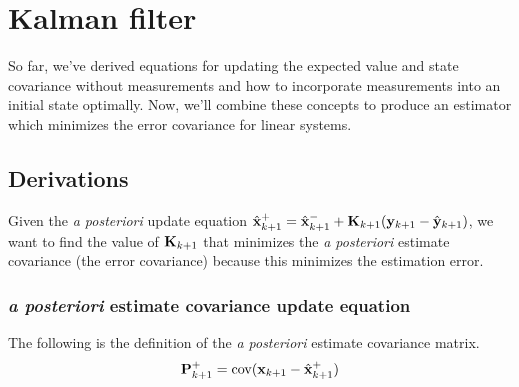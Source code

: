 \section{Kalman filter}

So far, we've derived equations for updating the expected value and state
covariance without measurements and how to incorporate measurements into an
initial \gls{state} optimally. Now, we'll combine these concepts to produce an
estimator which minimizes the error covariance for linear \glspl{system}.

\subsection{Derivations}

Given the \textit{a posteriori} update equation
$\hat{\mathbf{x}}_{k+1}^+ = \hat{\mathbf{x}}_{k+1}^- + \mathbf{K}_{k+1}(\mathbf{y}_{k+1} -
\hat{\mathbf{y}}_{k+1})$, we want to find the value of $\mathbf{K}_{k+1}$ that
minimizes the \textit{a posteriori} estimate covariance (the error covariance)
because this minimizes the estimation error.

\subsubsection{\textit{a posteriori} estimate covariance update equation}

The following is the definition of the \textit{a posteriori} estimate covariance
matrix.
\begin{equation*}
  \mathbf{P}_{k+1}^+ = \operatorname{cov}(\mathbf{x}_{k+1} - \hat{\mathbf{x}}_{k+1}^+)
\end{equation*}

